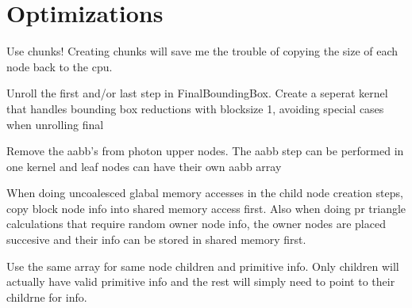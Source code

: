 \chapter{Optimizations}

Use chunks! Creating chunks will save me the trouble of copying the
size of each node back to the cpu.

Unroll the first and/or last step in FinalBoundingBox. Create a
seperat kernel that handles bounding box reductions with blocksize 1,
avoiding special cases when unrolling final

Remove the aabb's from photon upper nodes. The aabb step can be
performed in one kernel and leaf nodes can have their own aabb array

When doing uncoalesced glabal memory accesses in the child node
creation steps, copy block node info into shared memory access first.
Also when doing pr triangle calculations that require random owner
node info, the owner nodes are placed succesive and their info can be
stored in shared memory first.

Use the same array for same node children and primitive info. Only
children will actually have valid primitive info and the rest will
simply need to point to their childrne for info.
